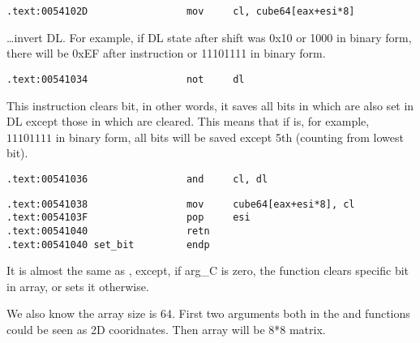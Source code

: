 
\begin{lstlisting}
.text:0054102D                 mov     cl, cube64[eax+esi*8]
\end{lstlisting}

{\dots invert DL. For example, if DL state after shift was 0x10 or 1000 in binary form, 
there will be 0xEF after \NOT instruction or 11101111 in binary form.}

\begin{lstlisting}
.text:00541034                 not     dl
\end{lstlisting}

{This instruction clears bit, in other words, it saves all bits in  which are also set in 
DL except those in  which are cleared. This means that if  is, for example, 
$11101111$ in binary form, all bits will be saved except 5th (counting from lowest bit).}

\begin{lstlisting}
.text:00541036                 and     cl, dl
\end{lstlisting}


\begin{lstlisting}
.text:00541038                 mov     cube64[eax+esi*8], cl
.text:0054103F                 pop     esi
.text:00541040                 retn
.text:00541040 set_bit         endp
\end{lstlisting}

{It is almost the same as , except, if arg\_C is zero, the function clears specific bit in array, 
or sets it otherwise.}

{We also know the array size is 64. First two arguments both in the  and  functions
could be seen as 2D cooridnates. Then array will be 8*8 matrix.}

